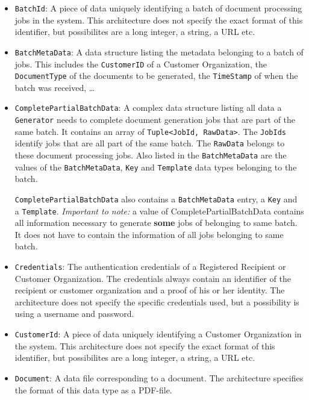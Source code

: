 \documentclass[a4paper,10pt]{article}
\begin{document}
\begin{itemize}
	\item \texttt{BatchId}: A piece of data uniquely identifying a batch of document processing jobs in the system. This architecture does not specify the exact format of this identifier, but possibilites are a long integer, a string, a URL etc.
	
	\item \texttt{BatchMetaData}: A data structure listing the metadata belonging to a batch of jobs. This includes the \texttt{CustomerID} of a Customer Organization, the \texttt{DocumentType} of the documents to be generated, the \texttt{TimeStamp} of when the batch was received, \dots
	
	\item \texttt{CompletePartialBatchData}: A complex data structure listing all data a \texttt{Generator} needs to complete document generation jobs that are part of the same batch. It contains an array of \texttt{Tuple<JobId, RawData>}. The \texttt{JobIds} identify jobs that are all part of the same batch. The \texttt{RawData} belongs to these document processing jobs. Also listed in the \texttt{BatchMetaData} are the values of the \texttt{BatchMetaData}, \texttt{Key} and \texttt{Template} data types belonging to the batch.	
	
	 \texttt{CompletePartialBatchData} also contains a \texttt{BatchMetaData} entry, a \texttt{Key} and a \texttt{Template}. \emph{Important to note:} a value of CompletePartialBatchData contains all information necessary to generate \textbf{some} jobs of belonging to same batch. It does not have to contain the information of all jobs belonging to same batch.

	\item \texttt{Credentials}: The authentication credentials of a Registered Recipient or Customer Organization. The credentials always contain an identifier of the recipient or customer organization and a proof of his or her identity. The architecture does not specify the specific credentials used, but a possibility is using a username and password.
	 
	\item \texttt{CustomerId}: A piece of data uniquely identifying a Customer Organization in the system. This architecture does not specify the exact format of this identifier, but possibilites are a long integer, a string, a URL etc.
	
	\item \texttt{Document}: A data file corresponding to a document.  The architecture specifies the format of this data type as a PDF-file. 
	

\end{itemize}
\end{document}

